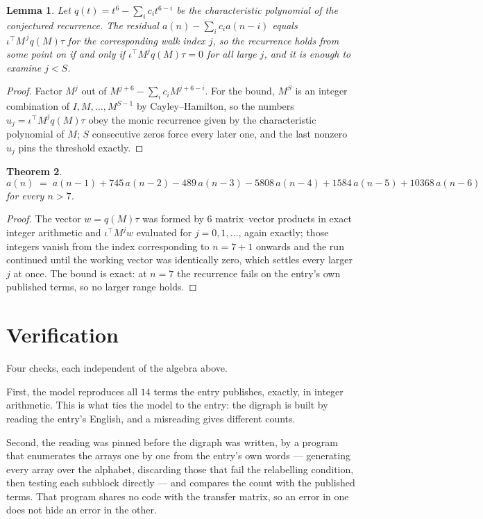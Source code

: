 \documentclass[11pt,a4paper]{article}
\theoremstyle{plain}
\newtheorem{theorem}{Theorem}
\newtheorem{lemma}[theorem]{Lemma}
\theoremstyle{definition}
\begin{document}
\begin{lemma}\label{lem:crit}
Let $q(t)=t^{6}-\sum_i c_it^{6-i}$ be the characteristic polynomial of the
conjectured recurrence. The residual $a(n)-\sum_ic_ia(n-i)$ equals
$\iota^{\!\top}M^{\,j}q(M)\tau$ for the corresponding walk index $j$, so the recurrence
holds from some point on if and only if $\iota^{\!\top}M^{j}q(M)\tau=0$ for all large $j$,
and it is enough to examine $j<S$.
\end{lemma}

\begin{proof}
Factor $M^{j}$ out of $M^{j+6}-\sum_ic_iM^{j+6-i}$. For the bound, $M^{S}$
is an integer combination of $I,M,\dots,M^{S-1}$ by Cayley--Hamilton, so the numbers
$u_j=\iota^{\!\top}M^{j}q(M)\tau$ obey the monic recurrence given by the characteristic
polynomial of $M$; $S$ consecutive zeros force every later one, and the last nonzero $u_j$
pins the threshold exactly.
\end{proof}

\begin{theorem}
\[
a(n)\;=\;a(n-1) + 745\,a(n-2) - 489\,a(n-3) - 5808\,a(n-4) + 1584\,a(n-5) + 10368\,a(n-6)
\]
for every $n>7$.
\end{theorem}

\begin{proof}
The vector $w=q(M)\tau$ was formed by $6$ matrix--vector products in exact integer
arithmetic and $\iota^{\!\top}M^{j}w$ evaluated for $j=0,1,\dots$, again exactly; those
integers vanish from the index corresponding to $n=7+1$ onwards and the run continued
until the working vector was identically zero, which settles every larger $j$ at once. The bound is exact: at $n=7$ the recurrence fails on the entry's own published terms, so no larger range holds.
\end{proof}

\section{Verification}

Four checks, each independent of the algebra above.

First, the model reproduces all $14$ terms the entry publishes, exactly, in integer
arithmetic. This is what ties the model to the entry: the digraph is built by reading the
entry's English, and a misreading gives different counts.

Second, the reading was pinned before the digraph was written, by a program that enumerates
the arrays one by one from the entry's own words --- generating every array over the
alphabet, discarding those that fail the relabelling condition, then testing each subblock
directly --- and compares the count with the published terms. That program shares no code
with the transfer matrix, so an error in one does not hide an error in the other.
\end{document}

